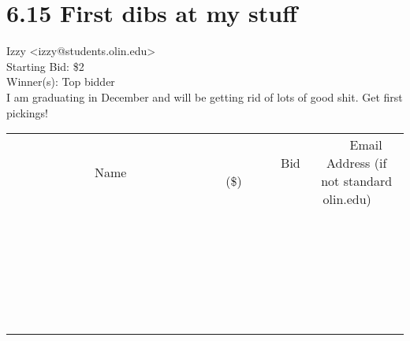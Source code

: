 \documentclass[11pt]{article}
\begin{document}
					\section*{6.15 First dibs at my stuff}
					Izzy <izzy@students.olin.edu> \\
					Starting Bid: \$2 \\
					Winner(s): Top bidder \\
					I am graduating in December and will be getting rid of lots of good shit. Get first pickings! \\
					[6ex]
					\begin{tabular}{c c c}
						~~~~~~~~~~~~~Name~~~~~~~~~~~~~ & ~~~~~~~~~Bid (\$)~~~~~~~~~ & ~~~Email Address (if not standard olin.edu)~~~ \\
				
 & & \\
\hline
 & & \\
\hline
 & & \\
\hline
 & & \\
\hline
 & & \\
\hline
 & & \\
\hline
 & & \\
\hline
 & & \\
\hline
 & & \\
\hline
 & & \\
\hline
 & & \\
\hline
 & & \\
\hline
 & & \\
\hline
 & & \\
\hline
 & & \\
\hline
 & & \\
\hline
 & & \\
\hline
 & & \\
\hline
 & & \\
\hline
 & & \\
\hline
 & & \\
\hline
 & & \\
\hline
 & & \\
\hline
 & & \\
\hline
 & & \\
\hline
 & & \\
\hline
					\end{tabular}
					\clearpage
				
\end{document}
